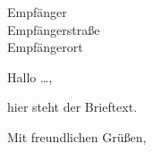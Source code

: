 \documentclass[ngerman]{scrlttr2}
\author{Autorname}
\begin{document}

	\begin{letter}{Empfänger\\Empfängerstraße\\Empfängerort}




		\opening{Hallo \dots,}

			hier steht der Brieftext.

		\closing{Mit freundlichen Grüßen,}


	\end{letter}
\end{document}
